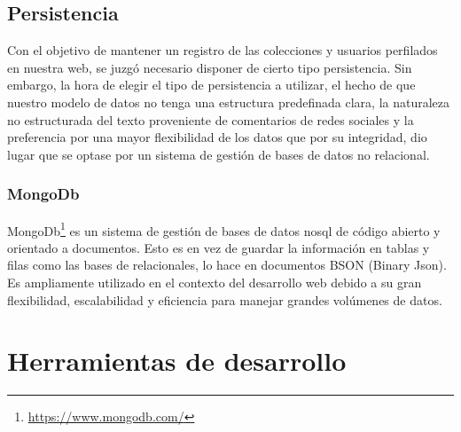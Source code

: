 \subsection{Persistencia}
Con el objetivo de mantener un registro de las colecciones y usuarios perfilados en nuestra web, se juzgó necesario disponer de cierto tipo persistencia. Sin embargo, la hora de elegir el tipo de persistencia a utilizar, el hecho de que nuestro modelo de datos no tenga una estructura predefinada clara, la naturaleza no estructurada del texto proveniente de comentarios de redes sociales y la preferencia por una mayor flexibilidad de los datos que por su integridad, dio lugar que se optase por un sistema de gestión de bases de datos no relacional. 
\subsubsection{MongoDb}
MongoDb\footnote{\url{https://www.mongodb.com/}} es un sistema de gestión de bases de datos \acrfull{nosql} de código abierto y orientado a documentos. Esto es en vez de guardar la información en tablas y filas como las bases de relacionales, lo hace en documentos BSON (Binary Json). Es ampliamente utilizado en el contexto del desarrollo web debido a su gran flexibilidad, escalabilidad y eficiencia para manejar grandes volúmenes de datos.
\section{Herramientas de desarrollo}
